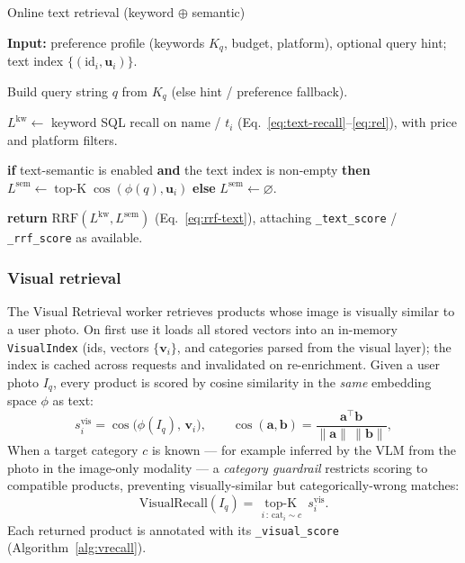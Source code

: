 \begin{chalgorithm}{Online text retrieval (keyword $\oplus$ semantic)}\label{alg:trecall}
  \item \textbf{Input:} preference profile (keywords $K_q$, budget, platform),
        optional query hint; text index $\{(\mathrm{id}_i,\mathbf{u}_i)\}$.
  \item Build query string $q$ from $K_q$ (else hint / preference fallback).
  \item $L^{\mathrm{kw}}\gets$ keyword SQL recall on $\mathrm{name}$ / $t_i$
        (Eq.~\ref{eq:text-recall}--\ref{eq:rel}), with price and platform filters.
  \item \textbf{if} text-semantic is enabled \textbf{and} the text index is
        non-empty \textbf{then}
        $L^{\mathrm{sem}}\gets\operatorname{top\text{-}K}\cos(\phi(q),\mathbf{u}_i)$
        \textbf{else} $L^{\mathrm{sem}}\gets\varnothing$.
  \item \textbf{return} $\mathrm{RRF}(L^{\mathrm{kw}},L^{\mathrm{sem}})$
        (Eq.~\ref{eq:rrf-text}), attaching \texttt{\_text\_score} /
        \texttt{\_rrf\_score} as available.
\end{chalgorithm}

\subsubsection{Visual retrieval}
\label{sec:photo}

The Visual Retrieval worker retrieves products whose image is visually similar
to a user photo. On first use it loads all stored vectors into an in-memory
\texttt{VisualIndex} (ids, vectors $\{\mathbf{v}_i\}$, and categories parsed from
the visual layer); the index is cached across requests and invalidated on
re-enrichment. Given a user photo $I_q$, every product is scored by cosine
similarity in the \emph{same} embedding space $\phi$ as text:
\begin{equation}
  s^{\mathrm{vis}}_i=\cos\!\big(\phi(I_q),\,\mathbf{v}_i\big),
  \qquad
  \cos(\mathbf{a},\mathbf{b})=\frac{\mathbf{a}^{\top}\mathbf{b}}{\lVert\mathbf{a}\rVert\,\lVert\mathbf{b}\rVert},
  \label{eq:svis}
\end{equation}
When a target category $c$ is known --- for example inferred by the VLM from the
photo in the image-only modality --- a \emph{category guardrail} restricts
scoring to compatible products, preventing visually-similar but
categorically-wrong matches:
\begin{equation}
  \mathrm{VisualRecall}(I_q)=\operatorname*{top\text{-}K}_{\,i\,:\,\mathrm{cat}_i\sim c}\ s^{\mathrm{vis}}_i .
  \label{eq:vrecall}
\end{equation}
Each returned product is annotated with its \texttt{\_visual\_score}
(Algorithm~\ref{alg:vrecall}).

